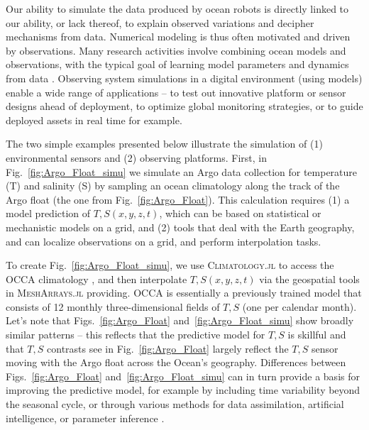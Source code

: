 \documentclass{juliacon}[12pt]
\newcommand{\pkg}[1]{{\small \textsc{#1}}}
\begin{document}
Our ability to simulate the data produced by ocean robots is directly linked to our ability, or lack thereof, to explain observed variations and decipher mechanisms from data. Numerical modeling is thus often motivated and driven by observations. Many research activities involve combining ocean models and observations, with the typical goal of learning model parameters and dynamics from data \cite{Forget2010,Forget2015a,FFL15,FP15,Forget2024a}. Observing system simulations in a digital environment (using models) enable a wide range of applications -- to test out innovative platform or sensor designs ahead of deployment, to optimize global monitoring strategies, or to guide deployed assets in real time for example.

The two simple examples presented below illustrate the simulation of (1) environmental sensors and (2) observing platforms. First, in Fig.~\ref{fig:Argo_Float_simu} we simulate an Argo data collection for temperature (T) and salinity (S) by sampling an ocean climatology along the track of the Argo float (the one from Fig.~\ref{fig:Argo_Float}). This calculation requires (1) a model prediction of $T,S(x,y,z,t)$, which can be based on statistical or mechanistic models on a grid, and (2) tools that deal with the Earth geography, and can localize observations on a grid, and perform interpolation tasks. 

To create Fig.~\ref{fig:Argo_Float_simu}, we use \pkg{Climatology.jl} to access the OCCA climatology \cite{Forget2010}, and then interpolate $T,S(x,y,z,t)$ via the geospatial tools in \pkg{MeshArrays.jl} providing. OCCA is essentially a previously trained model that consists of 12 monthly three-dimensional fields of $T,S$ (one per calendar month). Let's note that Figs.~\ref{fig:Argo_Float} and~\ref{fig:Argo_Float_simu} show broadly similar patterns -- this reflects that the predictive model for $T,S$ is skillful and that $T,S$ contrasts see in Fig.~\ref{fig:Argo_Float} largely reflect the $T,S$ sensor moving with the Argo float across the Ocean's geography. Differences between Figs.~\ref{fig:Argo_Float} and~\ref{fig:Argo_Float_simu} can in turn provide a basis for improving the predictive model, for example by including time variability beyond the seasonal cycle, or through various methods for data assimilation, artificial intelligence, or parameter inference \cite{Forget2010,Forget2015a,FFL15,FP15,Forget2024b}.
\end{document}
